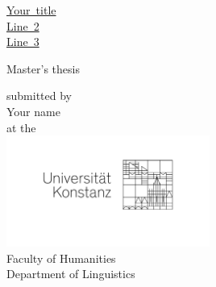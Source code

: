 \thispagestyle{empty}
\begin{center}
  \begin{sffamily}
    \begin{bfseries}
      \begin{LARGE}
	\mbox{\ul{Your title}}\\%
	\mbox{\ul{Line 2}}\\%
	\mbox{\ul{Line 3}}\\%
	\vspace{15mm}
      \end{LARGE}
      \begin{Large}
	\Large
    Master's thesis \\
      \end{Large}
    \end{bfseries}
    \begin{mdseries}
      \begin{large}
	\vspace{12mm}
	submitted by \\[0.6\baselineskip]
	Your name\\
	\vspace{12mm}
	at the\\[\baselineskip]
	{\includegraphics[width=0.5\textwidth]{upload/tex/figures/UniKonstanz-Logo-Optimum-sRGB.jpg}}\\
	\vspace{12mm}
	Faculty of Humanities\\[0.6\baselineskip]
	Department of Linguistics\\
      \end{large}
    \end{mdseries}
  \end{sffamily}

\end{center}

